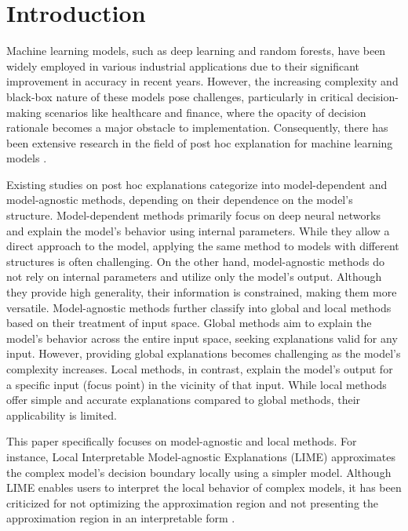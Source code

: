 \documentclass[runningheads]{llncs}
\begin{document}
\section{Introduction}
Machine learning models, such as deep learning and random forests,
have been widely employed in various industrial applications
due to their significant improvement in accuracy in recent years.
However,
the increasing complexity and black-box nature of these models pose challenges,
particularly in critical decision-making scenarios like healthcare and finance,
where the opacity of decision rationale becomes a major obstacle to 
implementation.
Consequently,
there has been extensive research in the field of post hoc explanation
for machine learning models \cite{%
  ribeiro2016why,ribeiro2018anchors,radulovic2023bella,guidotti2018local}.

Existing studies on post hoc explanations categorize into model-dependent and
model-agnostic methods,
depending on their dependence on the model's structure.
Model-dependent methods primarily focus on deep neural networks and
explain the model's behavior using internal parameters.
While they allow a direct approach to the model, 
applying the same method to models with different structures is often challenging. On the other hand, model-agnostic methods do not rely on internal parameters and utilize only the model's output. Although they provide high generality, their information is constrained, making them more versatile. Model-agnostic methods further classify into global and local methods based on their treatment of input space. Global methods aim to explain the model's behavior across the entire input space, seeking explanations valid for any input. However, providing global explanations becomes challenging as the model's complexity increases. Local methods, in contrast, explain the model's output for a specific input (focus point) in the vicinity of that input. While local methods offer simple and accurate explanations compared to global methods, their applicability is limited.

This paper specifically focuses on model-agnostic and local methods. For instance, Local Interpretable Model-agnostic Explanations (LIME) \cite{ribeiro2016why} approximates the complex model's decision boundary locally using a simpler model. Although LIME enables users to interpret the local behavior of complex models, it has been criticized for not optimizing the approximation region \cite{radulovic2023bella} and not presenting the approximation region in an interpretable form \cite{ribeiro2018anchors}.
\end{document}
